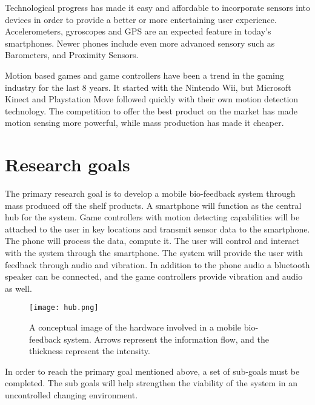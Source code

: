 Technological progress has made it easy and affordable to incorporate sensors into devices in order to provide a better or more entertaining user experience. Accelerometers, gyroscopes and GPS are an expected feature in today's smartphones. Newer phones include even more advanced sensory such as Barometers, and Proximity Sensors.

Motion based games and game controllers have been a trend in the gaming industry for the last 8 years. It started with the Nintendo Wii, but Microsoft Kinect and Playstation Move followed quickly with their own motion detection technology. The competition to offer the best product on the market has made motion sensing more powerful, while mass production has made it cheaper.

\section{Research goals}
The primary research goal is to develop a mobile bio-feedback system through mass produced off the shelf products. A smartphone will function as the central hub for the system. Game controllers with motion detecting capabilities will be attached to the user in key locations and transmit sensor data to the smartphone. The phone will process the data, compute it. The user will control and interact with the system through the smartphone. The system will provide the user with feedback through audio and vibration. In addition to the phone audio a bluetooth speaker can be connected, and the game controllers provide vibration and audio as well. 

\begin{figure}[h!]
  \centering
    \texttt{[image: hub.png]}
    \caption{\footnotesize A conceptual image of the hardware involved in a mobile bio-feedback system. Arrows represent the information flow, and the thickness represent the intensity.}
\end{figure}

In order to reach the primary goal mentioned above, a set of sub-goals must be completed. The sub goals will help strengthen the viability of the system in an uncontrolled changing environment.

